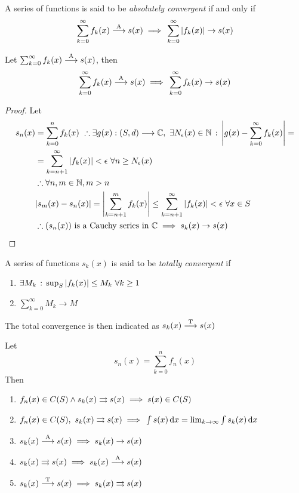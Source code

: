 \documentclass[../complete.tex]{subfiles}
\begin{document}
\begin{dfn}
	A series of functions is said to be \textit{absolutely convergent} if and only if
	\begin{equation}
		\sum_{k=0}^\infty f_k(x)\overset{\mathrm{A}}{\longrightarrow} s(x)\implies{}\sum_{k=0}^\infty\abs{f_k(x)}\to s(x)
		\label{eq:absoluteconvser}
	\end{equation}
\end{dfn}
\begin{thm}
	Let $\sum_{k=0}^\infty f_k(x)\overset{\mathrm{A}}{\longrightarrow} s(x)$, then
	\begin{equation}
		\sum_{k=0}^\infty f_k(x)\overset{\mathrm{A}}{\longrightarrow} s(x)\implies{}\sum_{k=0}^\infty f_k(x)\to s(x)
		\label{eq:abstounif}
	\end{equation}
\end{thm}
\begin{proof}
	Let
	\begin{equation*}
		\begin{aligned}
			s_n(x)&=\sum_{k=0}^nf_k(x)\ \therefore\exists g(x):(S,d)\fto\Cf,\ \exists N_\epsilon(x)\in\N\st\abs{g(x)-\sum_{k=0}^\infty f_k(x)}=\\
			&=\sum_{k=n+1}^{\infty}\abs{f_k(x)}<\epsilon\ \forall n\ge N_\epsilon(x)\\
			&\therefore\forall n,m\in\N, m>n\\
			&\abs{s_m(x)-s_n(x)}=\abs{\sum_{k=n+1}^mf_k(x)}\le\sum_{k=n+1}^{\infty}\abs{f_k(x)}<\epsilon\ \forall x\in S\\
			&\therefore(s_n(x))\text{ is a Cauchy series in }\Cf\implies{} s_k(x)\to s(x)
		\end{aligned}
	\end{equation*}
\end{proof}
\begin{dfn}
	A series of functions $s_k(x)$ is said to be \textit{totally convergent} if
	\begin{enumerate}
	\item $\exists M_k\, :\, \sup_{S}\abs{f_k(x)}\le M_k\ \forall k\ge 1$
	\item $\sum_{k=0}^\infty M_k\to M$
	\end{enumerate}
	The total convergence is then indicated as $s_k(x)\overset{\mathrm{T}}{\longrightarrow} s(x)$
\end{dfn}
\begin{prop}
	Let
	\begin{equation*}
		s_n(x)=\sum_{k=0}^{n}f_n(x)
	\end{equation*}
	Then
	\begin{enumerate}
	\item $f_n(x)\in C(S)\wedge s_k(x)\rightrightarrows s(x)\implies{} s(x)\in C(S)$
	\item $f_n(x)\in C(S),\ s_k(x)\rightrightarrows s(x)\implies{}\int s(x)\operatorname{d\!} x=\lim_{k\to\infty}\int s_k(x)\operatorname{d\!} x$
	\item $s_k(x)\overset{\mathrm{A}}{\longrightarrow} s(x)\implies{} s_k(x)\to s(x)$
	\item $s_k(x)\rightrightarrows s(x)\implies{} s_k(x)\overset{\mathrm{A}}{\longrightarrow} s(x)$
	\item $s_k(x)\overset{\mathrm{T}}{\longrightarrow} s(x)\implies{} s_k(x)\rightrightarrows s(x)$
	\end{enumerate}
\end{prop}
\end{document}
